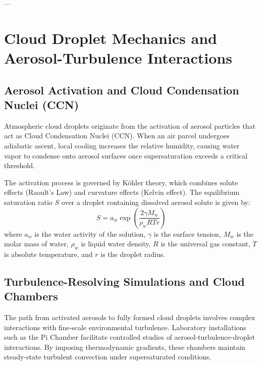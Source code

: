 \documentclass{article}
\begin{document}
---

\section{Cloud Droplet Mechanics and Aerosol-Turbulence Interactions}
\label{sec:cloud_dynamics}

\subsection{Aerosol Activation and Cloud Condensation Nuclei (CCN)}
Atmospheric cloud droplets originate from the activation of aerosol particles that act as Cloud Condensation Nuclei (CCN). When an air parcel undergoes adiabatic ascent, local cooling increases the relative humidity, causing water vapor to condense onto aerosol surfaces once supersaturation exceeds a critical threshold. 

The activation process is governed by Köhler theory, which combines solute effects (Raoult's Law) and curvature effects (Kelvin effect). The equilibrium saturation ratio $S$ over a droplet containing dissolved aerosol solute is given by:
\begin{equation}
S = a_w \exp\left( \frac{2\gamma M_w}{\rho_w R T r} \right)
\end{equation}
where $a_w$ is the water activity of the solution, $\gamma$ is the surface tension, $M_w$ is the molar mass of water, $\rho_w$ is liquid water density, $R$ is the universal gas constant, $T$ is absolute temperature, and $r$ is the droplet radius.

\subsection{Turbulence-Resolving Simulations and Cloud Chambers}
The path from activated aerosols to fully formed cloud droplets involves complex interactions with fine-scale environmental turbulence. Laboratory installations such as the Pi Chamber facilitate controlled studies of aerosol-turbulence-droplet interactions. By imposing thermodynamic gradients, these chambers maintain steady-state turbulent convection under supersaturated conditions.
\end{document}
